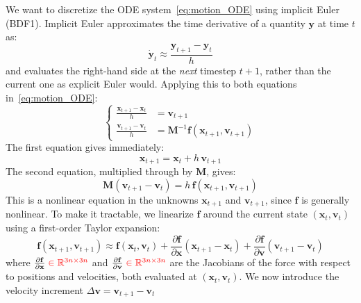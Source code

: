 \documentclass{article}
\newcommand{\pdc}[2]{\frac{\partial #1}{\partial #2}}
\newcommand{\red}[1]{\textcolor{red}{#1}}
\begin{document}
\begin{derivation}
We want to discretize the ODE system~\eqref{eq:motion_ODE} using implicit Euler (BDF1).
Implicit Euler approximates the time derivative of a quantity $\mathbf{y}$ at time $t$ as:
\begin{equation*}
    \dot{\mathbf{y}}_t \approx \frac{\mathbf{y}_{t+1} - \mathbf{y}_t}{h}
\end{equation*}
and evaluates the right-hand side at the \emph{next} timestep $t+1$, rather than the current
one as explicit Euler would. Applying this to both equations in~\eqref{eq:motion_ODE}:
\begin{equation*}
    \left\{
    \begin{aligned}
        \frac{\mathbf{x}_{t+1} - \mathbf{x}_t}{h} &= \mathbf{v}_{t+1} \\[1ex]
        \frac{\mathbf{v}_{t+1} - \mathbf{v}_t}{h} &= \mathbf{M}^{-1}\mathbf{f}(\mathbf{x}_{t+1}, \mathbf{v}_{t+1})
    \end{aligned}
    \right.
\end{equation*}
The first equation gives immediately:
\begin{equation}
\label{eq:deriv_position_update}
    \mathbf{x}_{t+1} = \mathbf{x}_t + h\,\mathbf{v}_{t+1}
\end{equation}
The second equation, multiplied through by $\mathbf{M}$, gives:
\begin{equation}
\label{eq:deriv_velocity_update_implicit}
    \mathbf{M}(\mathbf{v}_{t+1} - \mathbf{v}_t) = h\,\mathbf{f}(\mathbf{x}_{t+1}, \mathbf{v}_{t+1})
\end{equation}
This is a nonlinear equation in the unknowns $\mathbf{x}_{t+1}$ and $\mathbf{v}_{t+1}$, since
$\mathbf{f}$ is generally nonlinear. To make it tractable, we linearize $\mathbf{f}$ around
the current state $(\mathbf{x}_t, \mathbf{v}_t)$ using a first-order Taylor expansion:
\begin{equation*}
    \mathbf{f}(\mathbf{x}_{t+1}, \mathbf{v}_{t+1}) \approx
    \mathbf{f}(\mathbf{x}_t, \mathbf{v}_t)
    + \frac{\partial \mathbf{f}}{\partial \mathbf{x}}(\mathbf{x}_{t+1} - \mathbf{x}_t)
    + \frac{\partial \mathbf{f}}{\partial \mathbf{v}}(\mathbf{v}_{t+1} - \mathbf{v}_t)
\end{equation*}
where $\pdc{\mathbf{f}}{\mathbf{x}}\;\red{\in\mathbb{R}^{3n\times 3n}}$ and
$\pdc{\mathbf{f}}{\mathbf{v}}\;\red{\in\mathbb{R}^{3n\times 3n}}$ are the Jacobians of
the force with respect to positions and velocities, both evaluated at $(\mathbf{x}_t, \mathbf{v}_t)$.
We now introduce the velocity increment $\Delta\mathbf{v} = \mathbf{v}_{t+1} - \mathbf{v}_t$

\end{derivation}
\end{document}
